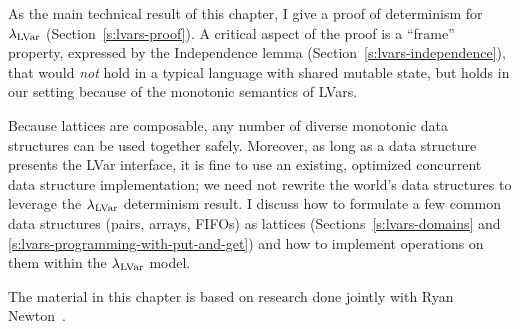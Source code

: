 As the main technical result of this chapter, I give a proof of
determinism for $\lambda_{\textrm{LVar}}$ (Section~\ref{s:lvars-proof}).  A
critical aspect of the proof is a ``frame'' property, expressed by the
Independence lemma (Section~\ref{s:lvars-independence}), that would
{\em not} hold in a typical language with shared mutable state, but
holds in our setting because of the monotonic semantics of LVars.

Because lattices are composable, any number of diverse monotonic data
structures can be used together safely.  Moreover, as long as a data
structure presents the LVar interface, it is fine to use an existing,
optimized concurrent data structure implementation; we need not
rewrite the world's data structures to leverage the $\lambda_{\textrm{LVar}}$
determinism result. I discuss how to formulate a few common data
structures (pairs, arrays, FIFOs) as lattices
(Sections~\ref{s:lvars-domains} and
\ref{s:lvars-programming-with-put-and-get}) and how to implement
operations on them within the $\lambda_{\textrm{LVar}}$ model.

The material in this chapter is based on research done jointly with
Ryan Newton~\cite{LVars-paper, LVars-tr}.
